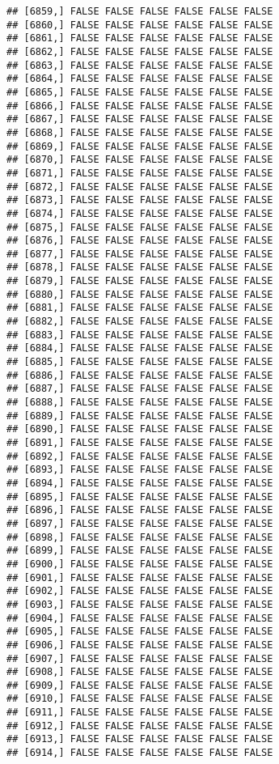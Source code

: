 \documentclass[
]{article}
\begin{document}
\begin{verbatim}
## [6859,] FALSE FALSE FALSE FALSE FALSE FALSE
## [6860,] FALSE FALSE FALSE FALSE FALSE FALSE
## [6861,] FALSE FALSE FALSE FALSE FALSE FALSE
## [6862,] FALSE FALSE FALSE FALSE FALSE FALSE
## [6863,] FALSE FALSE FALSE FALSE FALSE FALSE
## [6864,] FALSE FALSE FALSE FALSE FALSE FALSE
## [6865,] FALSE FALSE FALSE FALSE FALSE FALSE
## [6866,] FALSE FALSE FALSE FALSE FALSE FALSE
## [6867,] FALSE FALSE FALSE FALSE FALSE FALSE
## [6868,] FALSE FALSE FALSE FALSE FALSE FALSE
## [6869,] FALSE FALSE FALSE FALSE FALSE FALSE
## [6870,] FALSE FALSE FALSE FALSE FALSE FALSE
## [6871,] FALSE FALSE FALSE FALSE FALSE FALSE
## [6872,] FALSE FALSE FALSE FALSE FALSE FALSE
## [6873,] FALSE FALSE FALSE FALSE FALSE FALSE
## [6874,] FALSE FALSE FALSE FALSE FALSE FALSE
## [6875,] FALSE FALSE FALSE FALSE FALSE FALSE
## [6876,] FALSE FALSE FALSE FALSE FALSE FALSE
## [6877,] FALSE FALSE FALSE FALSE FALSE FALSE
## [6878,] FALSE FALSE FALSE FALSE FALSE FALSE
## [6879,] FALSE FALSE FALSE FALSE FALSE FALSE
## [6880,] FALSE FALSE FALSE FALSE FALSE FALSE
## [6881,] FALSE FALSE FALSE FALSE FALSE FALSE
## [6882,] FALSE FALSE FALSE FALSE FALSE FALSE
## [6883,] FALSE FALSE FALSE FALSE FALSE FALSE
## [6884,] FALSE FALSE FALSE FALSE FALSE FALSE
## [6885,] FALSE FALSE FALSE FALSE FALSE FALSE
## [6886,] FALSE FALSE FALSE FALSE FALSE FALSE
## [6887,] FALSE FALSE FALSE FALSE FALSE FALSE
## [6888,] FALSE FALSE FALSE FALSE FALSE FALSE
## [6889,] FALSE FALSE FALSE FALSE FALSE FALSE
## [6890,] FALSE FALSE FALSE FALSE FALSE FALSE
## [6891,] FALSE FALSE FALSE FALSE FALSE FALSE
## [6892,] FALSE FALSE FALSE FALSE FALSE FALSE
## [6893,] FALSE FALSE FALSE FALSE FALSE FALSE
## [6894,] FALSE FALSE FALSE FALSE FALSE FALSE
## [6895,] FALSE FALSE FALSE FALSE FALSE FALSE
## [6896,] FALSE FALSE FALSE FALSE FALSE FALSE
## [6897,] FALSE FALSE FALSE FALSE FALSE FALSE
## [6898,] FALSE FALSE FALSE FALSE FALSE FALSE
## [6899,] FALSE FALSE FALSE FALSE FALSE FALSE
## [6900,] FALSE FALSE FALSE FALSE FALSE FALSE
## [6901,] FALSE FALSE FALSE FALSE FALSE FALSE
## [6902,] FALSE FALSE FALSE FALSE FALSE FALSE
## [6903,] FALSE FALSE FALSE FALSE FALSE FALSE
## [6904,] FALSE FALSE FALSE FALSE FALSE FALSE
## [6905,] FALSE FALSE FALSE FALSE FALSE FALSE
## [6906,] FALSE FALSE FALSE FALSE FALSE FALSE
## [6907,] FALSE FALSE FALSE FALSE FALSE FALSE
## [6908,] FALSE FALSE FALSE FALSE FALSE FALSE
## [6909,] FALSE FALSE FALSE FALSE FALSE FALSE
## [6910,] FALSE FALSE FALSE FALSE FALSE FALSE
## [6911,] FALSE FALSE FALSE FALSE FALSE FALSE
## [6912,] FALSE FALSE FALSE FALSE FALSE FALSE
## [6913,] FALSE FALSE FALSE FALSE FALSE FALSE
## [6914,] FALSE FALSE FALSE FALSE FALSE FALSE

\end{verbatim}
\end{document}
